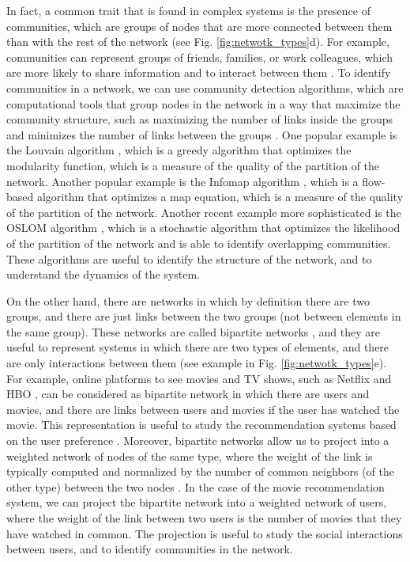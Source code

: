 In fact, a common trait that is found in complex systems is the presence of communities, which are groups of nodes that are more connected between them than with the rest of the network \cite{girvan-2002} (see Fig. \ref{fig:netwotk_types}d). For example, communities can represent groups of friends, families, or work colleagues, which are more likely to share information and to interact between them \cite{newman2003structure}. To identify communities in a network, we can use community detection algorithms, which are computational tools that group nodes in the network in a way that maximize the community structure, such as maximizing the number of links inside the groups and minimizes the number of links between the groups \cite{lancichinetti-2008,fortunato2010community}. One popular example is the Louvain algorithm \cite{blondel-2008}, which is a greedy algorithm that optimizes the modularity function, which is a measure of the quality of the partition of the network. Another popular example is the Infomap algorithm \cite{rosvall-2008}, which is a flow-based algorithm that optimizes a map equation, which is a measure of the quality of the partition of the network. Another recent example more sophisticated is the OSLOM algorithm \cite{OSLOM}, which is a stochastic algorithm that optimizes the likelihood of the partition of the network and is able to identify overlapping communities. These algorithms are useful to identify the structure of the network, and to understand the dynamics of the system.

On the other hand, there are networks in which by definition there are two groups, and there are just links between the two groups (not between elements in the same group). These networks are called bipartite networks \cite{newman2003structure}, and they are useful to represent systems in which there are two types of elements, and there are only interactions between them \cite{latapy-2008} (see example in Fig. \ref{fig:netwotk_types}e). For example, online platforms to see movies and TV shows, such as Netflix \cite{netflix} and HBO \cite{HBO}, can be considered as bipartite network in which there are users and movies, and there are links between users and movies if the user has watched the movie. This representation is useful to study the recommendation systems based on the user preference \cite{ricci-2011}. Moreover, bipartite networks allow us to project into a weighted network of nodes of the same type, where the weight of the link is typically computed and normalized by the number of common neighbors (of the other type) between the two nodes \cite{newman-2001-collaboration}. In the case of the movie recommendation system, we can project the bipartite network into a weighted network of users, where the weight of the link between two users is the number of movies that they have watched in common. The projection is useful to study the social interactions between users, and to identify communities in the network.

